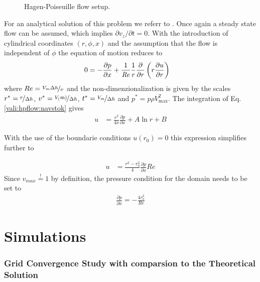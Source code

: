 \begin{figure}[!bp]
      \centering
      \caption{Hagen-Poiseuille flow setup.
                \label{validation:setup_hpflow}
      }
\end{figure}

For an analytical solution of this problem we referr to \citep{Kundu2012}.
Once again a steady state flow can be assumed, which implies $\partial v_z/\partial t = 0$. With the introduction of cylindrical coordinates $(r, \phi, x)$
and the assumption that the flow is independent of $\phi$ the equation of motion reduces to
\begin{align}
    \label{vali:hpflow:navstok}
        0 &= - \frac{\partial p}{\partial x}  +  \frac{1}{\mbox{\textit{Re}}} \frac{1}{r}\frac{\partial}{\partial r}\left(r\frac{\partial u}{\partial r}\right)
\end{align}
where $Re = \nicefrac{V_{m}\Delta h}{\nu}$
and the non-dimenzionalization is given by the scales
    $r^* = \nicefrac{r}{\Delta h}$, $v^*=\nicefrac{V_(\text{m})}{\Delta h}$,
    $t^* = \nicefrac{V_{\text{m}}}{\Delta h}$ and $p^* = p \rho V_{\text{max}}^2$.
The integration of Eq. \ref{vali:hpflow:navstok} gives
\begin{align}
    u &= \frac{r^2}{4\nu}\frac{\partial p}{\partial x} + A \ln r + B
\end{align}

\clearpage
With the use of the boundarie conditions $u(r_0) = 0$ this expression simplifies further to

\begin{align}
    u &= \frac{r^2 - r_0^2}{4}\frac{\partial p}{\partial x}Re
\end{align}
Since $v_{max} \stackrel{!}{=} 1$ by definition, the pressure condition for the domain needs to be set to
\begin{align}
    \frac{\partial p}{\partial x} = -\frac{4 r_o^2}{Re}
\end{align}

\section{Simulations}

\subsubsection{Grid Convergence Study with comparsion to the Theoretical Solution}

